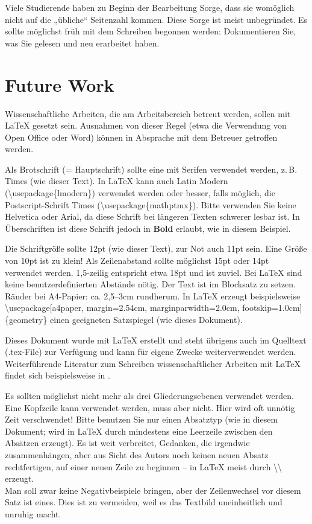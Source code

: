 \documentclass[
    fontsize=12pt,
    headings=small,
    parskip=half,           %
    bibliography=totoc,
    numbers=noenddot,       %
    open=any,               %
    ]{scrreprt}
\begin{document}
Viele Studierende haben zu Beginn der Bearbeitung Sorge, dass sie womöglich nicht auf die „übliche“ Seitenzahl kommen. Diese Sorge ist meist unbegründet. Es sollte möglichst früh mit dem Schreiben begonnen werden: Dokumentieren Sie, was Sie gelesen und neu erarbeitet haben.

\section{Future Work}

Wissenschaftliche Arbeiten, die am Arbeitsbereich betreut werden, sollen mit LaTeX gesetzt sein. Ausnahmen von dieser Regel (etwa die Verwendung von Open Office oder Word) können in Absprache mit dem Betreuer getroffen werden.

Als Brotschrift (= Hauptschrift) sollte eine mit Serifen verwendet werden, z.\,B. Times (wie dieser Text). In LaTeX kann auch Latin Modern (\textbackslash usepackage\{lmodern\}) verwendet werden oder besser, falls möglich, die Postscript-Schrift Times (\textbackslash usepackage\{mathptmx\}). Bitte verwenden Sie keine \textsf{Helvetica} oder \textsf{Arial}, da diese Schrift bei längeren Texten schwerer lesbar ist. In Überschriften ist diese Schrift jedoch in \textsf{\textbf{Bold}} erlaubt, wie in diesem Beispiel.

Die Schriftgröße sollte 12pt (wie dieser Text), zur Not auch 11pt sein. Eine Größe von 10pt ist zu klein! Als Zeilenabstand sollte möglichst 15pt oder 14pt verwendet werden. 1,5-zeilig entspricht etwa 18pt und ist zuviel. Bei LaTeX sind keine benutzerdefinierten Abstände nötig. Der Text ist im Blocksatz zu setzen. Ränder bei A4-Papier: ca. 2,5--3cm rundherum. In LaTeX erzeugt beispielsweise \textbackslash usepackage[a4paper, margin=2.54cm, marginparwidth=2.0cm, footskip=1.0cm]\{geometry\} einen geeigneten Satzspiegel (wie dieses Dokument).

Dieses Dokument wurde mit LaTeX erstellt und steht übrigens auch im Quelltext (.tex-File) zur Verfügung und kann für eigene Zwecke weiterverwendet werden. Weiterführende Literatur zum Schreiben wissenschaftlicher Arbeiten mit LaTeX findet sich beispielsweise in \cite{Schl2013}.

Es sollten möglichst nicht mehr als drei Gliederungsebenen verwendet werden. Eine Kopfzeile kann verwendet werden, muss aber nicht. Hier wird oft unnötig Zeit verschwendet! Bitte benutzen Sie nur einen Absatztyp (wie in diesem Dokument; wird in LaTeX durch mindestens eine Leerzeile zwischen den Absätzen erzeugt). Es ist weit verbreitet, Gedanken, die irgendwie zusammenhängen, aber aus Sicht des Autors noch keinen neuen Absatz rechtfertigen, auf einer neuen Zeile zu beginnen -- in LaTeX meist durch {\textbackslash\textbackslash} erzeugt.\\ Man soll zwar keine Negativbeispiele bringen, aber der Zeilenwechsel vor diesem Satz ist eines. Dies ist zu vermeiden, weil es das Textbild uneinheitlich und unruhig macht.
\end{document}
